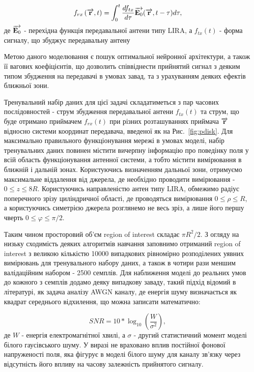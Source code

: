 \begin{equation}
f_{rx} \left( \overrightarrow{\mathbf r}, t \right) = 
\int_0^t \frac{d f_{tx}}{d \tau} \overrightarrow{\mathbf E_0} (\overrightarrow{\mathbf r}, t - \tau) d \tau,
\end{equation}
%
де $ \overrightarrow{\mathbf E_0} $ - перехідна функція передавальної антени типу LIRA, а 
$ f_{tx} (t) $ - форма сигналу, що збуджує передавальну антену

Метою даного моделювання є пошук оптимальної нейронної архітектури, а також 
її вагових коефіцієнтів, що дозволить співвіднести прийнятий сигнал з деяким 
типом збудження на передавачі в умовах завад, та з урахуванням деяких ефектів 
ближньої зони.

Тренувальний набір даних для цієї задачі складатиметься з пар часових 
послідовностей - струм збудження передавальної антени $ f_{tx} (t) $ та струм, 
що буде отримано приймачем $ f_{rx} (t) $ при різних розташуваннях 
приймача $ \overrightarrow{\mathbf r} $ відносно системи координат передавача, введеної як на 
Рис.~\ref{fig:pdisk}. Для максимально правильного функціонування мережі в 
умовах моделі, набір тренувальних даних повинен містити вичерпну інформацію про 
поведінку поля у всій область функціонування антенної системи, а тобто містити 
вимірювання в ближній і дальній зонах. Користуючись визначенням дальньої зони,
отримуємо максимальне віддалення від джерела, де необхідно проводити 
вимірювання - $ 0 \leq z \leq 8R $. Користуючись направленістю антен типу 
LIRA, обмежимо радіус поперечного зрізу циліндричної області, де проводяться 
вимірювання $ 0 \leq \rho \leq R $, а користуючись симетрією джерела розглянемо 
не весь зріз, а лише його першу чверть $ 0 \leq \varphi \leq \pi / 2 $.

Таким чином просторовий об'єм region of interest складає $ \pi R^2 / 2 $. 
З огляду на низьку сходимість деяких алгоритмів навчання заповнимо 
отриманий region of interest з великою кількістю 10000 випадкових рівномірно 
розподілених уявних вимірювань для тренувального набору даних, а також
в чотири рази меншим валідаційним набором - 2500 семплів. Для наближення 
моделі до реальних умов до кожного з семплів додамо деяку випадкову заваду,
такий підхід відомий в літературі, як задача аналізу AWGN каналу, де енергія 
шуму визначається як квадрат середнього відхилення, що можна записати 
математично:

\begin{equation} \label{eq:snr}
SNR = 10 * \log_{10} \left( \frac{W}{\sigma^2} \right),
\end{equation}
%
де $ W $ - енергія електромагнітної хвилі, а $ \sigma $ - другий статистичний 
момент моделі білого гаусівського шуму. У виразі не враховано вплив постійної 
фонової напруженості поля, яка фігурує в моделі білого шуму для каналу зв'язку 
через відсутність його впливу на часову залежність прийнятого сигналу.

